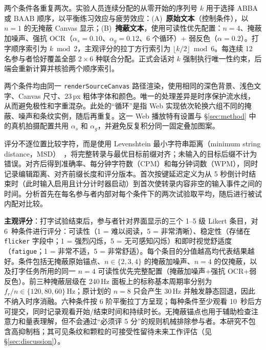 \documentclass{ieeeaccess}
\begin{document}
{两个条件各重复两次。实验人员连续分配的从零开始的序列号 $k$ 用于选择 ABBA 或 BAAB 顺序，以平衡练习效应与疲劳效应：(A)~\textbf{原始文本}（控制条件），以 $n=1$ 的无掩蔽 Canvas 显示；(B)~\textbf{掩蔽文本}，使用可读性优先配置：$n=4$、掩蔽加噪声、强抗 OCR（$\alpha_s=0.10$、$\alpha_g=0.12$、6 个循环）+ 弱反色（$\alpha=0.2$）。打字顺序索引为 $k\bmod2$，主观评分的拉丁方行索引为 $\lfloor k/2\rfloor\bmod6$。每连续 12 名参与者恰好覆盖全部 $2\times6$ 种联合分配。正式会话对 $k$ 强制执行唯一性约束，后端会重新计算并核验两个顺序索引。

两个条件均由同一 \texttt{render\allowbreak Source\allowbreak Canvas} 路径渲染，使用相同的深色背景、浅色文字、Canvas 尺寸、23\,px 粗体字体和颜色。唯一的处理差异是时序保护流水线，从而避免极性和字重混杂。此处的“循环”是指 Web 实现依次轮换六组不同的掩蔽、噪声和条纹实例，随后再重复。这一 Web 播放特有设置与 \S\ref{sec:method} 中的真机拍摄配置共用 $\alpha_s$ 和 $\alpha_g$，并避免反复积分同一固定叠加图案。

评分不逐位置比较字符，而是使用 Levenshtein 最小字符串距离（minimum string distance，MSD）~\cite{b_soukoreff2003}，将完整转录与最优目标前缀对齐；未输入的目标后缀不计为错误。对齐后得到准确率、每分钟字符数（CPM）和每分钟词数（WPM），同时记录编辑距离、对齐前缀长度和评分版本。首次按键延迟定义为从 5 秒倒计时结束时（此时输入启用且计分计时器启动）到首次使转录内容非空的输入事件之间的时间。分析首先在每名参与者内部对每个条件下的两次试验取平均，随后进行被试内配对比较。

\textbf{主观评分}：打字试验结束后，参与者针对界面显示的三个 1--5 级 Likert 条目，对 6~种条件进行评分：可读性（1 = 难以阅读，5 = 非常清晰）、稳定性（存储在 \texttt{flicker} 字段中；1 = 强烈闪烁，5 = 无可感知闪烁）和即时视觉舒适度（\texttt{fatigue}；1 = 非常不适，5 = 非常舒适）。每个条目的分值越高均代表结果越好。条件包括无掩蔽原始锚点、$n\in\{2,3,4\}$ 的掩蔽加噪声、$n=4$ 的仅掩蔽，以及打字任务所用的同一 $n=4$ 可读性优先完整配置（掩蔽加噪声+强抗 OCR+弱反色）。前三种掩蔽层级在 240\,Hz 面板上的标称基本周期率分别为 $f_r/n\in\{120, 80, 60\}$\,Hz；原计划的 $n=8$ 只会产生 30\,Hz 并触发静态回退，因此不纳入时序消融。六种条件按 6 阶平衡拉丁方呈现；每种条件至少观看 10~秒后方可提交，同时记录观看开始/结束时间和持续时长。无掩蔽锚点也用于辅助检查注意力和量表理解，但不会通过“必须评 5 分”的规则机械排除参与者。本研究不包含高抑制档；其可见条纹和颗粒的可接受性留待未来工作评估（见 \S\ref{sec:discussion}）。

}
\end{document}
